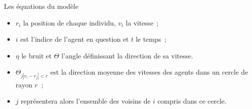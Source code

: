 \documentclass[aspectratio=43, a4paper, 12pt]{beamer}
\begin{document}
\begin{frame}{Les équations du modèle}

		\begin{itemize}
				   \item<1-3> $r_{i}$ la position de chaque individu, $v_i$ la vitesse~;
				   \item<2-3> $i$ est l'indice de l'agent en question et $t$ le temps~;
				   \item<3-3> $\eta$ le bruit et $\Theta$ l'angle définissant la direction de sa vitesse.
		\end{itemize}
				
		\vspace{-2cm} 
		\begin{itemize}
				   \item<4-> $\Theta_{j |r_{i}-r_{j}|<r}$ est la direction moyenne des vitesses des agents dans un cercle de rayon $r$~;
					\item<5->  $j$ représentera alors l'ensemble des voisins de $i$ compris dans ce cercle.		
					
		\end{itemize}
	\end{frame}
	
\end{document}
